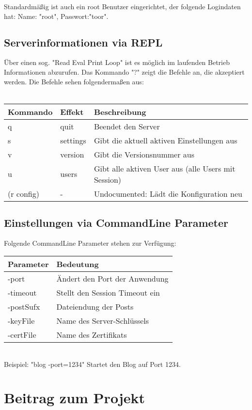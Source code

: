 \documentclass[10pt]{article}
\begin{document}
		Standardm\"a{\ss}ig ist auch ein root Benutzer eingerichtet, der folgende Logindaten hat: Name: "root", Passwort:"toor".
		\subsection{Serverinformationen via REPL}
		\"Uber einen sog. "Read Eval Print Loop" ist es m\"oglich im laufenden Betrieb Informationen abzurufen.
		Das Kommando "?" zeigt die Befehle an, die akzeptiert werden. Die Befehle sehen folgenderma{\ss}en aus:\\\\
		\begin{tabular}{l|l|l}
			Kommando   & Effekt   & Beschreibung\\
			\hline
			q          & quit     & Beendet den Server\\
			s          & settings & Gibt die aktuell aktiven Einstellungen aus\\
			v          & version  & Gibt die Versionsnummer aus\\
			u          & users    & Gibt alle aktiven User aus (alle Users mit Session)\\
			(r config) & -        & Undocumented: L\"adt die Konfiguration neu
		\end{tabular}
		\subsection{Einstellungen via CommandLine Parameter}
		Folgende CommandLine Parameter stehen zur Verf\"ugung:
		\begin{tabular}{l|l}
			Parameter & Bedeutung\\
			\hline
			-port & \"Andert den Port der Anwendung\\
			-timeout & Stellt den Session Timeout ein\\
			-postSufx & Dateiendung der Posts\\
			-keyFile & Name des Server-Schl\"ussels\\
			-certFile & Name des Zertifikats
		\end{tabular}\\
		Beispiel: "blog -port=1234" Startet den Blog auf Port 1234.
	\section{Beitrag zum Projekt}
\end{document}
